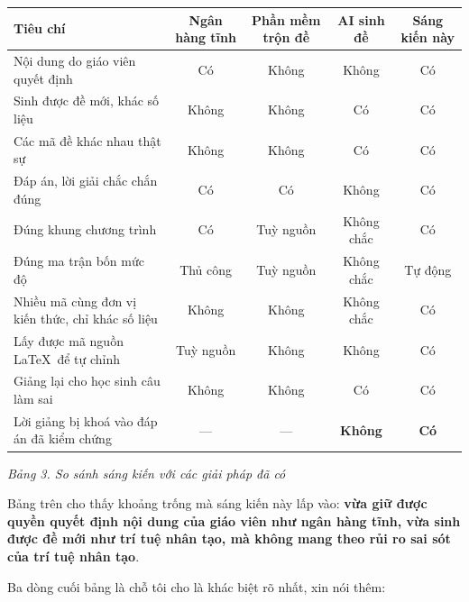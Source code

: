 \begin{center}
\begin{tabular}{|p{3.2cm}|c|c|c|c|}
\hline
\textbf{Tiêu chí} & \textbf{Ngân hàng tĩnh} & \textbf{Phần mềm trộn đề} &
\textbf{AI sinh đề} & \textbf{Sáng kiến này} \\ \hline
Nội dung do giáo viên quyết định & Có & Không & Không & Có \\ \hline
Sinh được đề mới, khác số liệu & Không & Không & Có & Có \\ \hline
Các mã đề khác nhau thật sự & Không & Không & Có & Có \\ \hline
Đáp án, lời giải chắc chắn đúng & Có & Có & Không & Có \\ \hline
Đúng khung chương trình & Có & Tuỳ nguồn & Không chắc & Có \\ \hline
Đúng ma trận bốn mức độ & Thủ công & Tuỳ nguồn & Không chắc & Tự động \\ \hline
Nhiều mã cùng đơn vị kiến thức, chỉ khác số liệu & Không & Không & Không chắc & Có \\ \hline
Lấy được mã nguồn \LaTeX\ để tự chỉnh & Tuỳ nguồn & Không & Không & Có \\ \hline
Giảng lại cho học sinh câu làm sai & Không & Không & Có & Có \\ \hline
Lời giảng bị khoá vào đáp án đã kiểm chứng & --- & --- & \textbf{Không} & \textbf{Có} \\ \hline
\end{tabular}
\end{center}
\textit{Bảng 3. So sánh sáng kiến với các giải pháp đã có}

Bảng trên cho thấy khoảng trống mà sáng kiến này lấp vào: \textbf{vừa giữ được
quyền quyết định nội dung của giáo viên như ngân hàng tĩnh, vừa sinh được đề
mới như trí tuệ nhân tạo, mà không mang theo rủi ro sai sót của trí tuệ nhân
tạo}.

Ba dòng cuối bảng là chỗ tôi cho là khác biệt rõ nhất, xin nói thêm:

